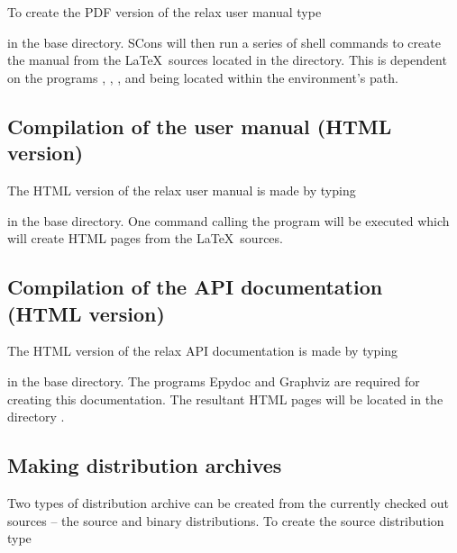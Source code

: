 To create the PDF version of the relax user manual type


in the base directory.
SCons will then run a series of shell commands to create the manual from the \LaTeX\ sources located in the  directory.
This is dependent on the programs , , , and  being located within the environment's path.



\subsection{Compilation of the user manual (HTML version)}

The HTML version of the relax user manual is made by typing


in the base directory.
One command calling the program  will be executed which will create HTML pages from the \LaTeX\ sources.



\subsection{Compilation of the API documentation (HTML version)}

The HTML version of the relax API documentation is made by typing


in the base directory.
The programs Epydoc and Graphviz are required for creating this documentation.
The resultant HTML pages will be located in the directory .



\subsection{Making distribution archives}

Two types of distribution archive can be created from the currently checked out sources -- the source and binary distributions.
To create the source distribution type 

